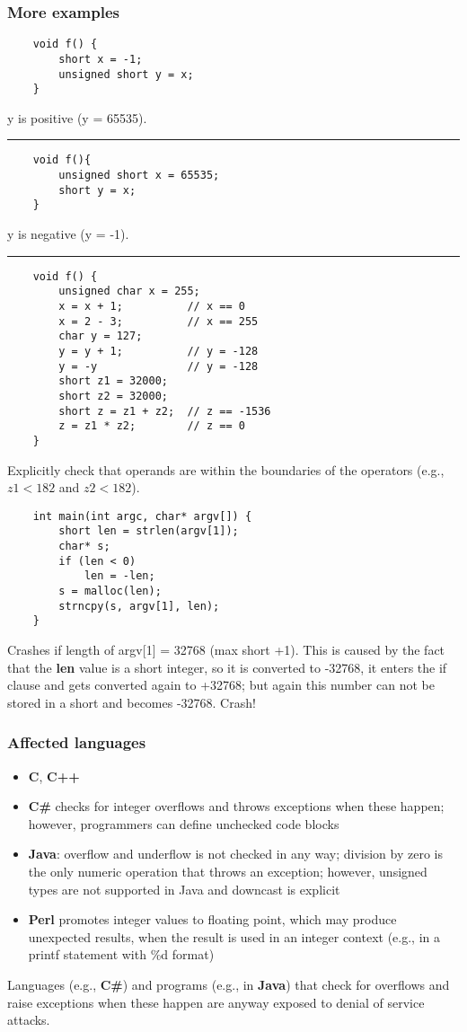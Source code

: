 \documentclass[a4paper, 10pt, titlepage]{article}
\begin{document}
\subsubsection*{More examples}
\begin{lstlisting}
	void f() {
		short x = -1;
		unsigned short y = x;
	}
\end{lstlisting}
y is positive (y = 65535).
\\\noindent\rule{10cm}{0.4pt}

\begin{lstlisting}
	void f(){
		unsigned short x = 65535;
		short y = x;
	}
\end{lstlisting}
y is negative (y = -1).
\\\noindent\rule{10cm}{0.4pt}
\begin{lstlisting}
	void f() {
		unsigned char x = 255;
		x = x + 1; 			// x == 0
		x = 2 - 3; 			// x == 255
		char y = 127;
		y = y + 1; 			// y = -128
		y = -y				// y = -128
		short z1 = 32000;
		short z2 = 32000;
		short z = z1 + z2; 	// z == -1536
		z = z1 * z2;		// z == 0
	}
\end{lstlisting}
Explicitly check that operands are within the boundaries of the operators (e.g., $z1 < 182$ and $z2 < 182$).
\begin{lstlisting}
	int main(int argc, char* argv[]) {
		short len = strlen(argv[1]);
		char* s;
		if (len < 0)
			len = -len;
		s = malloc(len);
		strncpy(s, argv[1], len);
	}
\end{lstlisting}
Crashes if length of argv[1] = 32768 (max short +1). This is caused by the fact that the \textbf{len} value is a short integer, so it is converted to -32768, it enters the if clause and gets converted again to +32768; but again this number can not be stored in a short and becomes -32768. Crash! \medskip

\subsubsection*{Affected languages}
\begin{itemize}
\item \textbf{C}, \textbf{C++}
\item \textbf{C\#} checks for integer overflows and throws exceptions when these happen; however, programmers can define unchecked code blocks
\item \textbf{Java}: overflow and underflow is not checked in any way; division by zero is the only numeric operation that throws an exception; however, unsigned types are not supported in Java and downcast is explicit
\item \textbf{Perl} promotes integer values to floating point, which may produce unexpected results, when the result is used in an integer
context (e.g., in a printf statement with \%d format)
\end{itemize}
Languages (e.g., \textbf{C\#}) and programs (e.g., in \textbf{Java}) that check for overflows and raise exceptions when these happen are anyway exposed to denial of service attacks.
\end{document}
